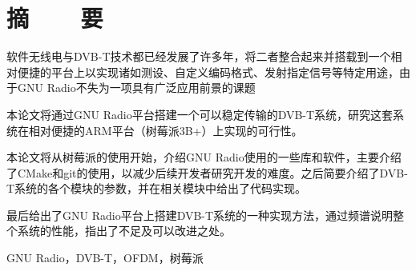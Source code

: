 \renewcommand{\baselinestretch}{1.5}
\fontsize{12pt}{13pt}\selectfont

\chapter*{摘~~~~要}

\par 软件无线电与DVB-T技术都已经发展了许多年，将二者整合起来并搭载到一个相对便捷的平台上以实现诸如测设、自定义编码格式、发射指定信号等特定用途，由于GNU Radio不失为一项具有广泛应用前景的课题
\par 本论文将通过GNU Radio平台搭建一个可以稳定传输的DVB-T系统，研究这套系统在相对便捷的ARM平台（树莓派3B+）上实现的可行性。
\par 本论文将从树莓派的使用开始，介绍GNU Radio使用的一些库和软件，主要介绍了CMake和git的使用，以减少后续开发者研究开发的难度。之后简要介绍了DVB-T系统的各个模块的参数，并在相关模块中给出了代码实现。
\par 最后给出了GNU Radio平台上搭建DVB-T系统的一种实现方法，通过频谱说明整个系统的性能，指出了不足及可以改进之处。
\par 

\vspace{1em}
 \quad GNU Radio，DVB-T，OFDM，树莓派

\clearpage
\endinput
